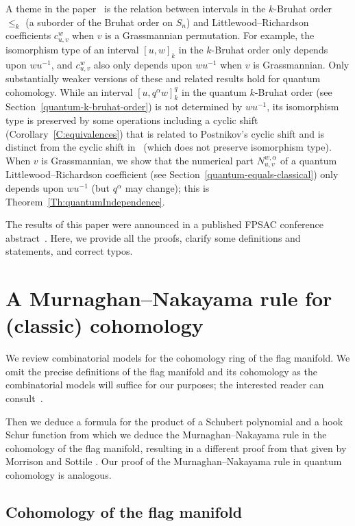 A theme in the paper~\cite{BS-Bruhat} is the relation between intervals in the $k$-Bruhat order~$\leq_k$ (a suborder of the Bruhat order on
$S_n$) and Littlewood--Richardson coefficients $c^w_{u,v}$ when $v$ is a Grassmannian permutation.
For example, the isomorphism type of an interval $[u,w]_k$ in the $k$-Bruhat order only depends upon $wu^{-1}$, and $c^w_{u,v}$ also only
depends upon $wu^{-1}$ when $v$ is Grassmannian.
Only substantially weaker versions of these and related results hold for quantum cohomology.
While an interval $[u,q^\alpha w]_k^q$ in the quantum $k$-Bruhat order (see Section~\ref{quantum-k-bruhat-order}) is not determined by
$wu^{-1}$, its isomorphism type is preserved by some operations including a cyclic shift (Corollary~\ref{C:equivalences}) that is related to
Postnikov's cyclic shift and is distinct from the cyclic shift in~\cite{BS-Bruhat} (which does not preserve isomorphism type).
When $v$ is Grassmannian, we show that the numerical part $N^{w,\alpha}_{u,v}$ of a quantum Littlewood--Richardson coefficient (see
Section~\ref{quantum-equals-classical}) only depends upon $wu^{-1}$ (but $q^\alpha$ may change); this is
Theorem~\ref{Th:quantumIndependence}.

\begin{remark}\label{rem:fpsac}
The results of this paper were announced in a published FPSAC conference abstract~\cite{FPSAC23}. Here, we provide all the proofs, clarify some definitions and statements, and correct typos.
\end{remark}

\section{A Murnaghan--Nakayama rule for (classic) cohomology}
\label{sec:classic-mn-rule}

We review combinatorial models for the cohomology ring of the flag manifold.
We omit the precise definitions of the flag manifold and
its cohomology as the combinatorial models will suffice for our purposes; the
interested reader can consult~\cite{Fu97}.

Then we deduce a formula for the product of a Schubert polynomial and a hook
Schur function from which we deduce the Murnaghan--Nakayama rule in the
cohomology of the flag manifold, resulting in a different proof from that given by Morrison and Sottile \cite{MorrisonSottile}.
Our proof of the Murnaghan--Nakayama rule in quantum cohomology is analogous.

\subsection{Cohomology of the flag manifold}
\label{cohomology-ring-of-the-flag-manifold}

